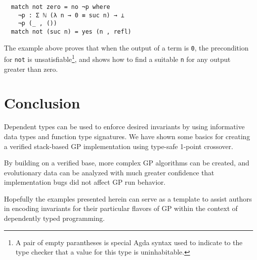 \documentclass[runningheads,a4paper]{llncs}
\begin{document}
\begin{verbatim}
  match not zero = no ¬p where
    ¬p : Σ ℕ (λ n → 0 ≡ suc n) → ⊥
    ¬p (_ , ())
  match not (suc n) = yes (n , refl)
\end{verbatim}

The example above proves that when the output of a term is \texttt{0},
the precondition for \texttt{not} is unsatisfiable\footnote{A pair of empty
  parantheses is special Agda syntax used to indicate to the type
  checker that a value for this type is uninhabitable.}, and shows how
to find a suitable \texttt{n} for any output greater than zero.

\section{Conclusion}

Dependent types can be used to enforce desired invariants by using
informative data types and function type signatures. We have shown
some basics for creating a verified stack-based GP implementation
using type-safe 1-point crossover.

By building on a verified base, more complex GP algorithms can be
created, and evolutionary data can be analyzed with much greater
confidence that implementation bugs did not affect GP run behavior.

Hopefully the examples presented herein can serve as a template to
assist authors in encoding invariants for their particular flavors of
GP within the context of dependently typed programming.



\end{document}
